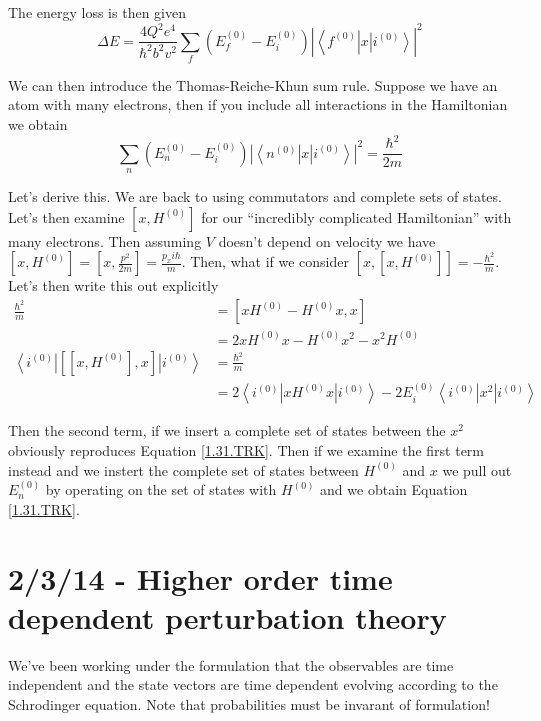 \documentclass[10pt]{report}
\newcommand{\bra}[1]{\left<#1\right|}
\newcommand{\ket}[1]{\left|#1\right>}
\newcommand{\abs}[1]{\left|#1\right|}
\begin{document}
The energy loss is then given
\begin{equation}
    \Delta E = \frac{4Q^2e^4}{\hbar^2 b^2 v^2}\sum_f \left( E_f^{(0)} - E_i^{(0)} \right)\abs{\bra{f^{(0)}}x\ket{i^{(0)}}}^2
\end{equation}

We can then introduce the Thomas-Reiche-Khun sum rule. Suppose we have an atom with many electrons, then if you include all interactions in the Hamiltonian we obtain 
\begin{equation}
    \sum_n (E_n^{(0)} - E_i^{(0)})\abs{\bra{n^{(0)}}x\ket{i^{(0)}}}^2 = \frac{\hbar^2}{2m}
    \label{1.31.TRK}
\end{equation}

Let's derive this. We are back to using commutators and complete sets of states. Let's then examine $[x, H^{(0)}]$ for our ``incredibly complicated Hamiltonian'' with many electrons. Then assuming $V$ doesn't depend on velocity we have $[x, H^{(0)}] = \left[ x, \frac{p^2}{2m} \right] = \frac{p_x i\hbar}{m}$. Then, what if we consider $[x, [x, H^{(0)}]] = -\frac{\hbar^2}{m}$. Let's then write this out explicitly
\begin{align}
    \frac{\hbar^2}{m} &= \left[ xH^{(0)} - H^{(0)}x, x \right]\\
    &= 2x H^{(0)}x - H^{(0)}x^2 - x^2H^{(0)}\\
    \bra{i^(0)}\left[ \left[ x, H^{(0)} \right], x \right]\ket{i^{(0)}} &= \frac{\hbar^2}{m}\\
    &= 2\bra{i^{(0)}}xH^{(0)}x\ket{i^{(0)}} - 2E_i^{(0)}\bra{i^{(0)}}x^2\ket{i^{(0)}}
\end{align}

Then the second term, if we insert a complete set of states between the $x^2$ obviously reproduces Equation \ref{1.31.TRK}. Then if we examine the first term instead and we instert the complete set of states between $H^{(0)}$ and $x$ we pull out $E^{(0)}_n$ by operating on the set of states with $H^{(0)}$ and we obtain Equation \ref{1.31.TRK}.

\chapter{2/3/14 - Higher order time dependent perturbation theory}

We've been working under the formulation that the observables are time independent and the state vectors are time dependent evolving according to the Schrodinger equation. Note that probabilities must be invarant of formulation!
\end{document}
